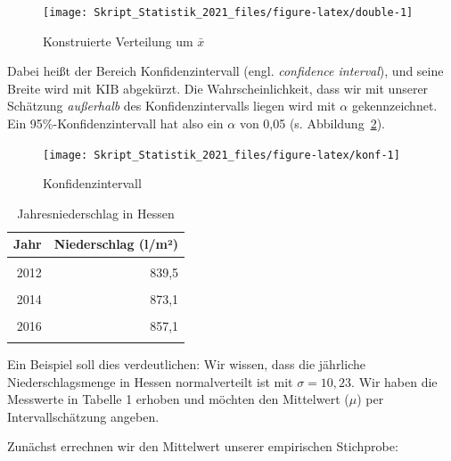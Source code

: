 \documentclass[
  11pt,
  ngerman,
  a4paper,
]{report}
\begin{document}
\begin{figure}[!h]

{\centering \texttt{[image: Skript\_Statistik\_2021\_files/figure-latex/double-1]} 

}

\caption{Konstruierte Verteilung um $\bar{x}$}\label{fig:double}
\end{figure}

Dabei heißt der Bereich Konfidenzintervall (engl. \emph{confidence interval}), und seine Breite wird mit \(\textrm{KIB}\) abgekürzt. Die Wahrscheinlichkeit, dass wir mit unserer Schätzung \emph{außerhalb} des Konfidenzintervalls liegen wird mit \(\alpha\) gekennzeichnet. Ein 95\%-Konfidenzintervall hat also ein \(\alpha\) von 0,05 (s. Abbildung~\ref{fig:konf}).

\begin{figure}[!h]

{\centering \texttt{[image: Skript\_Statistik\_2021\_files/figure-latex/konf-1]} 

}

\caption{Konfidenzintervall}\label{fig:konf}
\end{figure}

\begin{table}

\caption{\label{tab:tab}Jahresniederschlag in Hessen}
\centering
\begin{tabular}[t]{rr}
\toprule
\textbf{Jahr} & \textbf{Niederschlag (l/m²)}\\
\midrule
\cellcolor{gray!6}{2011} & \cellcolor{gray!6}{855,3}\\
2012 & 839,5\\
\cellcolor{gray!6}{2013} & \cellcolor{gray!6}{850,6}\\
2014 & 873,1\\
\cellcolor{gray!6}{2015} & \cellcolor{gray!6}{858,3}\\
2016 & 857,1\\
\cellcolor{gray!6}{2017} & \cellcolor{gray!6}{861,4}\\
\bottomrule
\end{tabular}
\end{table}

Ein Beispiel soll dies verdeutlichen: Wir wissen, dass die jährliche Niederschlagsmenge in Hessen normalverteilt ist mit \(\sigma=10{,}23\). Wir haben die Messwerte in Tabelle 1 erhoben und möchten den Mittelwert (\(\mu\)) per Intervallschätzung angeben.

Zunächst errechnen wir den Mittelwert unserer empirischen Stichprobe:
\end{document}
